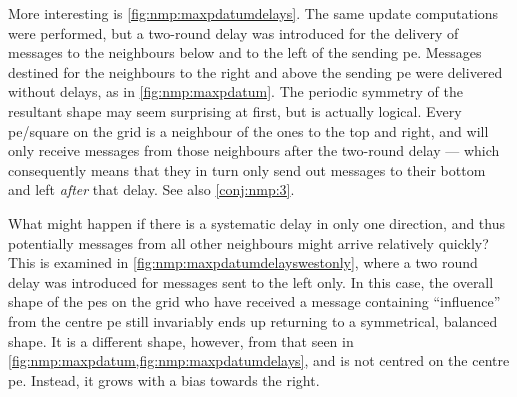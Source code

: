 More interesting is \cref{fig:nmp:maxpdatumdelays}.  The same update computations were performed, but a two-round delay was introduced for the delivery of messages to the neighbours below and to the left of the sending \gls{pe}.  Messages destined for the neighbours to the right and above the sending \gls{pe} were delivered without delays, as in \cref{fig:nmp:maxpdatum}.  The periodic symmetry of the resultant shape may seem surprising at first, but is actually logical.  Every \gls{pe}/square on the grid is a neighbour of the ones to the top and right, and will only receive messages from those neighbours after the two-round delay --- which consequently means that they in turn only send out messages to their bottom and left \emph{after} that delay.  See also \cref{conj:nmp:3}.

What might happen if there is a systematic delay in only one direction, and thus potentially messages from all other neighbours might arrive relatively quickly?  This is examined in \cref{fig:nmp:maxpdatumdelayswestonly}, where a two round delay was introduced for messages sent to the left only.  In this case, the overall shape of the \glspl{pe} on the grid who have received a message containing ``influence'' from the centre \gls{pe} still invariably ends up returning to a symmetrical, balanced shape.  It is a different shape, however, from that seen in \cref{fig:nmp:maxpdatum,fig:nmp:maxpdatumdelays}, and is not centred on the centre \gls{pe}.  Instead, it grows with a bias towards the right.

